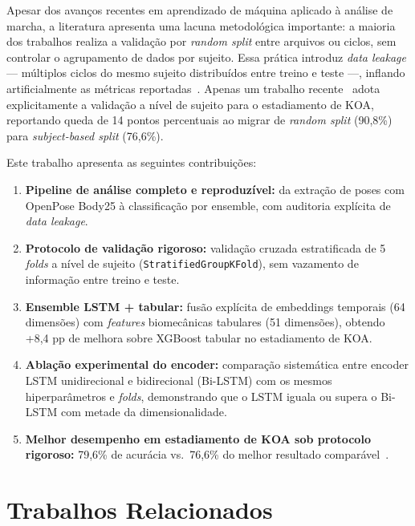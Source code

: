 \documentclass[a4paper,12pt]{article}
\begin{document}
Apesar dos avanços recentes em aprendizado de máquina aplicado à análise de marcha,
a literatura apresenta uma lacuna metodológica importante: a maioria dos trabalhos
realiza a validação por \textit{random split} entre arquivos ou ciclos, sem
controlar o agrupamento de dados por sujeito. Essa prática introduz
\textit{data leakage} --- múltiplos ciclos do mesmo sujeito distribuídos entre
treino e teste ---, inflando artificialmente as métricas reportadas~\cite{Kaya2025}.
Apenas um trabalho recente~\cite{Kaya2025} adota explicitamente a validação a nível
de sujeito para o estadiamento de KOA, reportando queda de 14 pontos percentuais ao
migrar de \textit{random split} (90,8\%) para \textit{subject-based split} (76,6\%).

Este trabalho apresenta as seguintes contribuições:

\begin{enumerate}[label=\arabic*.]
  \item \textbf{Pipeline de análise completo e reproduzível:} da extração de poses
        com OpenPose Body25 à classificação por ensemble, com auditoria explícita de
        \textit{data leakage}.
  \item \textbf{Protocolo de validação rigoroso:} validação cruzada estratificada de
        5 \textit{folds} a nível de sujeito (\texttt{StratifiedGroupKFold}), sem
        vazamento de informação entre treino e teste.
  \item \textbf{Ensemble LSTM + tabular:} fusão explícita de embeddings temporais
        (64 dimensões) com \textit{features} biomecânicas tabulares (51 dimensões),
        obtendo +8,4 pp de melhora sobre XGBoost tabular no estadiamento de KOA.
  \item \textbf{Ablação experimental do encoder:} comparação sistemática entre
        encoder LSTM unidirecional e bidirecional (Bi-LSTM) com os mesmos
        hiperparâmetros e \textit{folds}, demonstrando que o LSTM iguala ou supera
        o Bi-LSTM com metade da dimensionalidade.
  \item \textbf{Melhor desempenho em estadiamento de KOA sob protocolo rigoroso:}
        79,6\% de acurácia vs.\ 76,6\% do melhor resultado comparável~\cite{Kaya2025}.
\end{enumerate}

\section{Trabalhos Relacionados}
\end{document}
